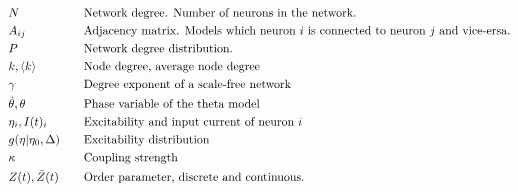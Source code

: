 %
%

\begin{alignat*}{2}
& N &&\text{Network degree. Number of neurons in the network.}\\
&A_{ij} &&\text{Adjacency matrix. Models which neuron $i$ is connected to neuron $j$ and vice-ersa.}\\
& P &&\text{Network degree distribution.}\\
& k, {\langle k\rangle} &&\text{Node degree, average node degree}\\
&\gamma &&\text{Degree exponent of a scale-free network}\\
&{\dot{\theta}}, \theta &&\text{Phase variable of the theta model}\\
&\eta_i, I(t)_i &&\text{Excitability and input current of neuron $i$}\\
&g(\eta \rvert \eta_0, \Delta) \quad &&\text{Excitability distribution}\\
&\kappa &&\text{Coupling strength}\\
& Z(t), \bar{Z}(t) &&\text{Order parameter, discrete and continuous.}\\
\end{alignat*}
